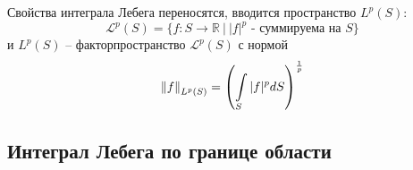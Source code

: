\documentclass[12pt,a4paper]{article}
\newcommand{\intset}[1]{\int\limits_{#1}}
\newcommand{\Real}{\mathbb{R}}
\begin{document}
Свойства интеграла Лебега переносятся, вводится пространство $L^p (S)$:
\begin{equation*}
\mathcal{L}^p (S) = \{ f : S \to \Real \ | \ |f|^p \text{ - суммируема на } S \}
\end{equation*}
и $L^p (S)$ -- факторпространство $\mathcal{L}^p (S)$ с нормой
\begin{equation*}
\norm{f}_{L^p (S)} = \left(\intset{S}{|f|^p dS}\right)^{\frac{1}{p}}
\end{equation*}

\subsection{Интеграл Лебега по границе области}

\newpage

\end{document}
